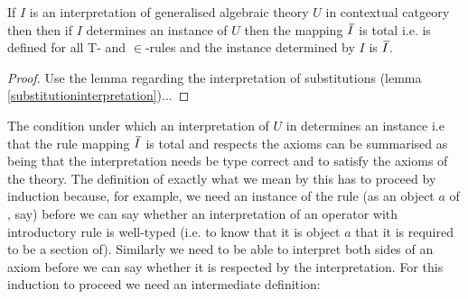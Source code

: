 \begin{lemma} 
If $I$ is an interpretation of generalised algebraic theory $U$ in contextual catgeory \catcw then then if $I$ determines an instance of $U$ then the
mapping $\Ibar$  is total i.e. is defined for all T- and $\in$-rules and the instance determined by $I$ is $\Ibar$.
\end{lemma}
\begin{proof}  
Use the lemma regarding the interpretation of substitutions (lemma \ref{substitutioninterpretation})...
\end{proof}

The condition under which an interpretation of $U$ in \catcw determines an instance i.e that the rule mapping $\Ibar$ is total and respects the axioms can be summarised as being that the interpretation needs be type correct and to satisfy the axioms of the theory. The definition of exactly what we mean by this has to proceed by induction because, for example, we need an instance of the rule
 (as an object $a$ of \catc, say) before we can say whether an interpretation of an operator with introductory rule \genericfintroductoryrule
is well-typed (i.e. to know that it is object $a$ that it is required to be a section of).
Similarly we need to be able to interpret both sides of an axiom before we can say whether it is respected
by the interpretation. For this induction to proceed we need an intermediate definition:

\def\restrict{\mathbin{\restriction}}
\newcommand{\predInstance}{\overline{I \restrict U_p}}
\newcommand{\Uincrement}{U \setminus\kern-2pt U_p}

